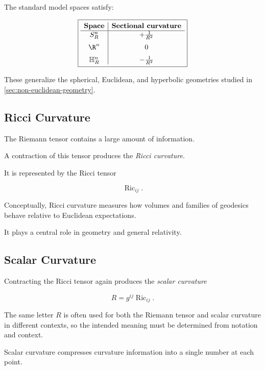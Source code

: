 The standard model spaces satisfy:

\[
\boxed{
\begin{array}{c|c}
\textbf{Space} & \textbf{Sectional curvature}\\
\hline
S^n_R & +\frac{1}{R^2}\\[2mm]
\R^n & 0\\[2mm]
\mathbb{H}^n_R & -\frac{1}{R^2}
\end{array}
}
\]

These generalize the spherical, Euclidean, and hyperbolic geometries studied
in \cref{sec:non-euclidean-geometry}.

\subsection{Ricci Curvature}
\label{subsec:ricci-curvature}

The Riemann tensor contains a large amount of information.

A contraction of this tensor produces the \emph{Ricci curvature}.

It is represented by the Ricci tensor

\[
\boxed{
\operatorname{Ric}_{ij}.
}
\]

Conceptually, Ricci curvature measures how volumes and families of geodesics
behave relative to Euclidean expectations.

It plays a central role in geometry and general relativity.

\subsection{Scalar Curvature}
\label{subsec:scalar-curvature}

Contracting the Ricci tensor again produces the \emph{scalar curvature}

\[
\boxed{
R
=
g^{ij}\operatorname{Ric}_{ij}.
}
\]

The same letter \(R\) is often used for both the Riemann tensor and scalar
curvature in different contexts, so the intended meaning must be determined
from notation and context.

Scalar curvature compresses curvature information into a single number at
each point.

